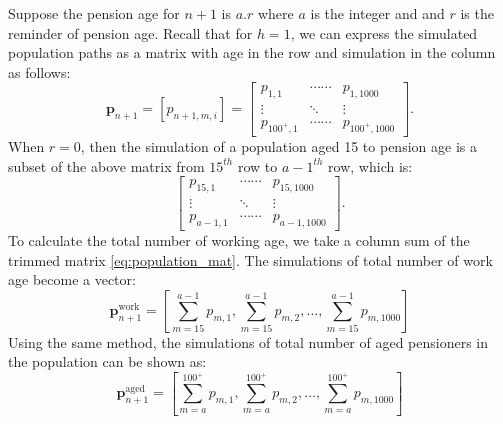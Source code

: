 \documentclass[11pt,a4paper,]{article}
\begin{document}
Suppose the pension age for \(n+1\) is \(a.r\) where \(a\) is the integer and and \(r\) is the reminder of pension age. Recall that for \(h=1\), we can express the simulated population paths as a matrix with age in the row and simulation in the column as follows:
\[
  \bm{p}_{n+1}=[p_{n+1,m,i}] =
    \begin{bmatrix}
       p_{1,1} & \cdots\cdots & p_{1,1000} \\
      \vdots & \ddots & \vdots \\
      p_{100^+,1} & \cdots\cdots &p_{100^+,1000}
      \end{bmatrix}.
\]
When \(r=0\), then the simulation of a population aged 15 to pension age is a subset of the above matrix from \(15^{th}\) row to \(a-1^{th}\) row, which is:
\begin{equation}
  \begin{bmatrix}
    p_{15,1} & \cdots\cdots & p_{15,1000} \\
    \vdots & \ddots & \vdots \\
    p_{a-1,1} & \cdots\cdots &p_{a-1,1000}
  \end{bmatrix}. \label{eq:population_mat}
\end{equation}
To calculate the total number of working age, we take a column sum of the trimmed matrix \eqref{eq:population_mat}. The simulations of total number of work age become a vector:
\begin{equation}
  \bm{p}^{\text{work}}_{n+1} = \left[\sum_{m=15}^{a-1}p_{m,1},\sum_{m=15}^{a-1}p_{m,2},\dots,\sum_{m=15}^{a-1}p_{m,1000}\right] \label{eq:work}
\end{equation}
Using the same method, the simulations of total number of aged pensioners in the population can be shown as:
\begin{equation}
  \bm{p}^{\text{aged}}_{n+1} = \left[\sum_{m=a}^{100^+}p_{m,1},\sum_{m=a}^{100^+}p_{m,2},\dots,\sum_{m=a}^{100^+}p_{m,1000}\right]\label{eq:aged}
\end{equation}
\end{document}
